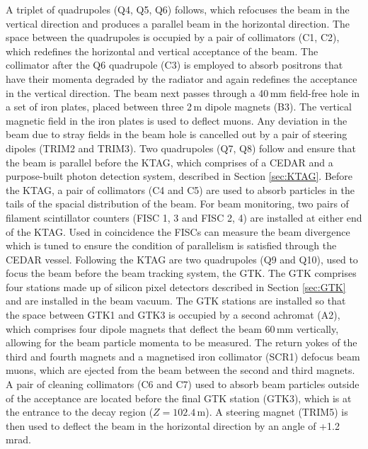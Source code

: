 \documentclass[../../main.tex]{subfiles}
\begin{document}
    A triplet of quadrupoles (Q4, Q5, Q6) follows, which refocuses the beam in the vertical direction and produces a parallel beam in the horizontal direction. The space between the quadrupoles is occupied by a pair of
    collimators (C1, C2), which redefines the horizontal and vertical acceptance of the beam. The collimator after the Q6 quadrupole (C3) is employed to absorb positrons that have their momenta degraded by the radiator 
    and again redefines the acceptance in the vertical direction.
    \newline\indent The beam next passes through a 40\,mm field-free hole in a set of iron plates, placed between three 2\,m dipole magnets (B3). The vertical magnetic field in the iron plates is used to deflect muons.
    Any deviation in the beam due to stray fields in the beam hole is cancelled out by a pair of steering dipoles (TRIM2 and TRIM3). Two quadrupoles (Q7, Q8) follow and ensure that the beam is parallel before the KTAG, which comprises of a \gls{CEDAR} and a purpose-built photon detection system, described in Section \ref{sec:KTAG}. 
    Before the KTAG, a pair of collimators (C4 and C5) are used to absorb particles in the tails of the spacial distribution of the beam.
    \newline\indent For beam monitoring, two pairs of filament scintillator counters (FISC 1, 3 and FISC 2, 4) are installed at either end of the KTAG. Used in coincidence the FISCs can measure the beam divergence which is tuned to ensure the condition of parallelism is satisfied through the \gls{CEDAR} vessel.
    \newline\indent Following the KTAG are two quadrupoles (Q9 and Q10), used to focus the beam before the beam tracking system, the \gls{GTK}. The \gls{GTK} comprises four stations made up of silicon pixel detectors described in Section \ref{sec:GTK} and are installed in the beam vacuum. 
    The GTK stations are installed so that the space between GTK1 and GTK3 is occupied by a second achromat (A2), which comprises four dipole magnets that deflect the beam 60\,mm vertically, allowing for the beam particle momenta to be measured. 
    The return yokes of the third and fourth magnets and a magnetised iron collimator (SCR1) defocus beam muons, which are ejected from the beam between the second and third magnets. A pair of cleaning collimators (C6 and C7) used to absorb beam particles outside of the acceptance are located before the final GTK station (GTK3), 
    which is at the entrance to the decay region ($Z = 102.4$\,m). A steering magnet (TRIM5) is then used to deflect the beam in the horizontal direction by an angle of +1.2\,mrad.
\end{document}
